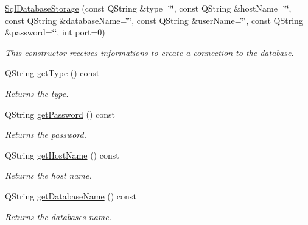 \begin{DoxyCompactItemize}
\item 
\mbox{\hyperlink{class_sql_database_storage_a691465c618b8050f5c67543f57fc4d15}{Sql\+Database\+Storage}} (const Q\+String \&type=\char`\"{}\char`\"{}, const Q\+String \&host\+Name=\char`\"{}\char`\"{}, const Q\+String \&database\+Name=\char`\"{}\char`\"{}, const Q\+String \&user\+Name=\char`\"{}\char`\"{}, const Q\+String \&password=\char`\"{}\char`\"{}, int port=0)
\begin{DoxyCompactList}\small\item\em This constructor receives informations to create a connection to the database. \end{DoxyCompactList}\item 
\mbox{\label{class_sql_database_storage_af63f84ae9263c490325f10bbb352c983}} 
Q\+String \mbox{\hyperlink{class_sql_database_storage_af63f84ae9263c490325f10bbb352c983}{get\+Type}} () const
\begin{DoxyCompactList}\small\item\em Returns the type. \end{DoxyCompactList}\item 
\mbox{\label{class_sql_database_storage_a1f87803a1217305b4bc05fd13bf36ba6}} 
Q\+String \mbox{\hyperlink{class_sql_database_storage_a1f87803a1217305b4bc05fd13bf36ba6}{get\+Password}} () const
\begin{DoxyCompactList}\small\item\em Returns the password. \end{DoxyCompactList}\item 
\mbox{\label{class_sql_database_storage_a23a969c1fd094a15b1787add541e9bb5}} 
Q\+String \mbox{\hyperlink{class_sql_database_storage_a23a969c1fd094a15b1787add541e9bb5}{get\+Host\+Name}} () const
\begin{DoxyCompactList}\small\item\em Returns the host name. \end{DoxyCompactList}\item 
\mbox{\label{class_sql_database_storage_a69dd2e9296bc727fa396316d1746dee8}} 
Q\+String \mbox{\hyperlink{class_sql_database_storage_a69dd2e9296bc727fa396316d1746dee8}{get\+Database\+Name}} () const
\begin{DoxyCompactList}\small\item\em Returns the database\textquotesingle{}s name. \end{DoxyCompactList}\item 

\end{DoxyCompactItemize}
